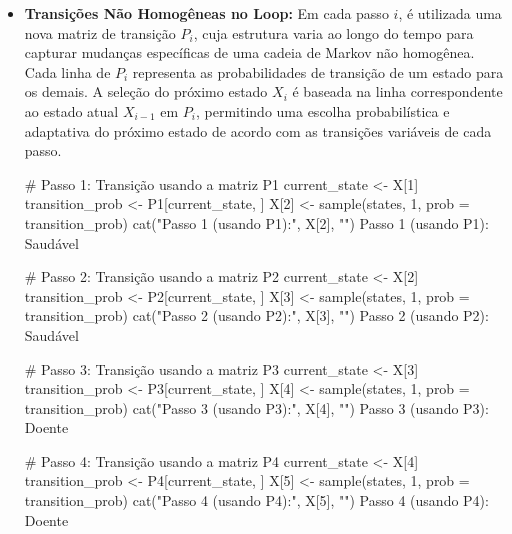 \documentclass[12pt, a4paper, openany]{book}
\numberwithin{equation}{chapter}
\numberwithin{table}{chapter}
\numberwithin{figure}{chapter}
\theoremstyle{break}
\begin{document}
\begin{itemize}
\begin{RCodeBox}
# Número de passos
n <- 5

# Inicializando a simulação
set.seed(123)  # Para resultados reproduzíveis
X <- character(n + 1)

# Passo 0: Estado inicial baseado na distribuição alpha
X[1] <- sample(states, 1, prob = alpha)
cat("Passo 0 (Estado inicial):", X[1], "\n")
Passo 0 (Estado inicial): Saudável 
\end{RCodeBox}



    

\item \textbf{Transições Não Homogêneas no Loop:} Em cada passo \( i \), é utilizada uma nova matriz de transição \( P_i \), cuja estrutura varia ao longo do tempo para capturar mudanças específicas de uma cadeia de Markov não homogênea. Cada linha de \( P_i \) representa as probabilidades de transição de um estado para os demais. A seleção do próximo estado \( X_i \) é baseada na linha correspondente ao estado atual \( X_{i-1} \) em \( P_i \), permitindo uma escolha probabilística e adaptativa do próximo estado de acordo com as transições variáveis de cada passo.




\begin{RCodeBox}

# Passo 1: Transição usando a matriz P1
current_state <- X[1]
transition_prob <- P1[current_state, ]
X[2] <- sample(states, 1, prob = transition_prob)
cat("Passo 1 (usando P1):", X[2], "\n")
Passo 1 (usando P1): Saudável 

# Passo 2: Transição usando a matriz P2
current_state <- X[2]
transition_prob <- P2[current_state, ]
X[3] <- sample(states, 1, prob = transition_prob)
cat("Passo 2 (usando P2):", X[3], "\n")
Passo 2 (usando P2): Saudável 

# Passo 3: Transição usando a matriz P3
current_state <- X[3]
transition_prob <- P3[current_state, ]
X[4] <- sample(states, 1, prob = transition_prob)
cat("Passo 3 (usando P3):", X[4], "\n")
Passo 3 (usando P3): Doente 

# Passo 4: Transição usando a matriz P4
current_state <- X[4]
transition_prob <- P4[current_state, ]
X[5] <- sample(states, 1, prob = transition_prob)
cat("Passo 4 (usando P4):", X[5], "\n")
Passo 4 (usando P4): Doente

\end{RCodeBox}






\end{itemize}
\end{document}
